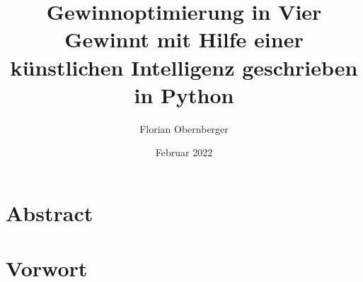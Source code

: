 \documentclass[a4paper,12pt,oneside,BCOR=0mm,bibliography=totoc,parskip=half]{vwa}
\title{Gewinnoptimierung in Vier Gewinnt mit Hilfe einer künstlichen Intelligenz geschrieben in Python} %
\subtitle{}
\author{Florian Obernberger}
\date{Februar 2022}
\begin{document}
\nobibliography*



\begin{titlepage}
    
\end{titlepage}



\chapter*{Abstract}\label{chapter:Abstract}


\chapter*{Vorwort}\label{chapter:Vorwort}


\mainmatter

\setcounter{page}{4} %
\tableofcontents
{}

\setcounter{figure}{0}







\end{document}

